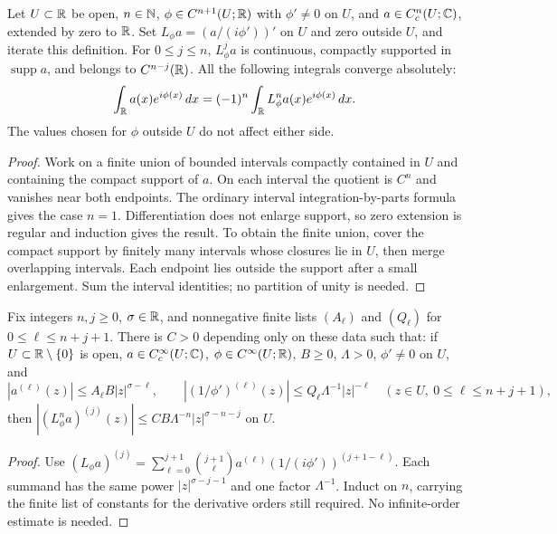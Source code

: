 \begin{lemma}
  \label{lem:c03_ibp_compact_iteration}
  Let $U\subset\mathbb{R}$ be open, $n\in\mathbb{N}$, $\phi\in C^{n+1}(U;\mathbb{R})$ with
  $\phi'\ne0$ on $U$, and $a\in C_c^n(U;\mathbb{C})$, extended by zero to $\mathbb{R}$.
  Set $L_\phi a=(a/(i\phi'))'$ on $U$ and zero outside $U$, and iterate this definition.
  For $0\le j\le n$, $L_\phi^j a$ is continuous, compactly supported in
  $\operatorname{supp}a$, and belongs to $C^{n-j}(\mathbb{R})$. All the following integrals converge absolutely:
  \[
    \int_{\mathbb{R}} a(x)e^{i\phi(x)}\,dx=(-1)^n\int_{\mathbb{R}} L_\phi^n a(x)e^{i\phi(x)}\,dx.
  \]
  The values chosen for $\phi$ outside $U$ do not affect either side.
\end{lemma}
\begin{proof}
  Work on a finite union of bounded intervals compactly contained in $U$ and containing
  the compact support of $a$. On each interval the quotient is $C^{n}$ and vanishes near
  both endpoints. The ordinary interval integration-by-parts formula gives the case $n=1$.
  Differentiation does not enlarge support, so zero extension is regular and induction gives the result.
  To obtain the finite union, cover the compact support by finitely many intervals whose closures lie
  in $U$, then merge overlapping intervals. Each endpoint lies outside the support after a small enlargement.
  Sum the interval identities; no partition of unity is needed.
\end{proof}

\begin{lemma}
  \label{lem:c03_ibp_symbol_iteration}
  Fix integers $n,j\ge0$, $\sigma\in\mathbb{R}$, and nonnegative finite lists $(A_\ell)$ and $(Q_\ell)$
  for $0\le\ell\le n+j+1$. There is $C>0$ depending only on these data such that:
  if $U\subset\mathbb{R}\setminus\{0\}$ is open, $a\in C_c^\infty(U;\mathbb{C})$,
  $\phi\in C^\infty(U;\mathbb{R})$, $B\ge0$, $\Lambda>0$, $\phi'\ne0$ on $U$, and
  \[
    |a^{(\ell)}(z)|\le A_\ell B|z|^{\sigma-\ell},\qquad
    |(1/\phi')^{(\ell)}(z)|\le Q_\ell\Lambda^{-1}|z|^{-\ell}
    \quad(z\in U,\ 0\le\ell\le n+j+1),
  \]
  then $|(L_\phi^n a)^{(j)}(z)|\le C B\Lambda^{-n}|z|^{\sigma-n-j}$ on $U$.
\end{lemma}
\begin{proof}
  Use $(L_\phi a)^{(j)}=\sum_{\ell=0}^{j+1}\binom{j+1}{\ell}
  a^{(\ell)}(1/(i\phi'))^{(j+1-\ell)}$. Each summand has the same power
  $|z|^{\sigma-j-1}$ and one factor $\Lambda^{-1}$. Induct on $n$, carrying the finite
  list of constants for the derivative orders still required. No infinite-order estimate is needed.
\end{proof}

